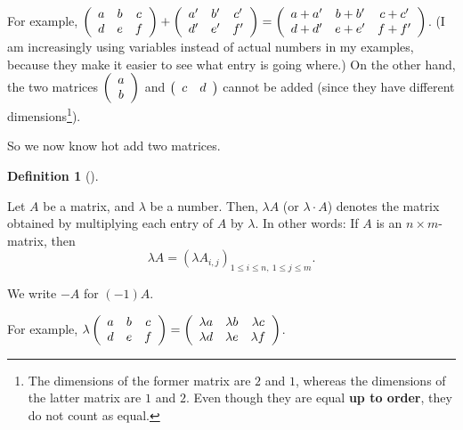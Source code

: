\documentclass[numbers=enddot,12pt,final,onecolumn,notitlepage]{scrartcl}%
\theoremstyle{definition}
\newtheorem{defi}[theo]{Definition}
\newenvironment{definition}[1][]
{\begin{defi}[#1]\begin{leftbar}}
{\end{leftbar}\end{defi}}
\begin{document}
For example, $\left(
\begin{array}
[c]{ccc}%
a & b & c\\
d & e & f
\end{array}
\right)  +\left(
\begin{array}
[c]{ccc}%
a^{\prime} & b^{\prime} & c^{\prime}\\
d^{\prime} & e^{\prime} & f^{\prime}%
\end{array}
\right)  =\left(
\begin{array}
[c]{ccc}%
a+a^{\prime} & b+b^{\prime} & c+c^{\prime}\\
d+d^{\prime} & e+e^{\prime} & f+f^{\prime}%
\end{array}
\right)  $. (I am increasingly using variables instead of actual numbers in my
examples, because they make it easier to see what entry is going where.) On
the other hand, the two matrices $\left(
\begin{array}
[c]{c}%
a\\
b
\end{array}
\right)  $ and $\left(
\begin{array}
[c]{cc}%
c & d
\end{array}
\right)  $ cannot be added (since they have different dimensions\footnote{The
dimensions of the former matrix are $2$ and $1$, whereas the dimensions of the
latter matrix are $1$ and $2$. Even though they are equal \textbf{up to
order}, they do not count as equal.}).

So we now know hot add two matrices.

\begin{definition}
Let $A$ be a matrix, and $\lambda$ be a number. Then, $\lambda A$ (or
$\lambda\cdot A$) denotes the matrix obtained by multiplying each entry of $A$
by $\lambda$. In other words: If $A$ is an $n\times m$-matrix, then%
\[
\lambda A=\left(  \lambda A_{i,j}\right)  _{1\leq i\leq n,\ 1\leq j\leq m}.
\]


We write $-A$ for $\left(  -1\right)  A$.
\end{definition}

For example, $\lambda\left(
\begin{array}
[c]{ccc}%
a & b & c\\
d & e & f
\end{array}
\right)  =\left(
\begin{array}
[c]{ccc}%
\lambda a & \lambda b & \lambda c\\
\lambda d & \lambda e & \lambda f
\end{array}
\right)  $.
\end{document}
